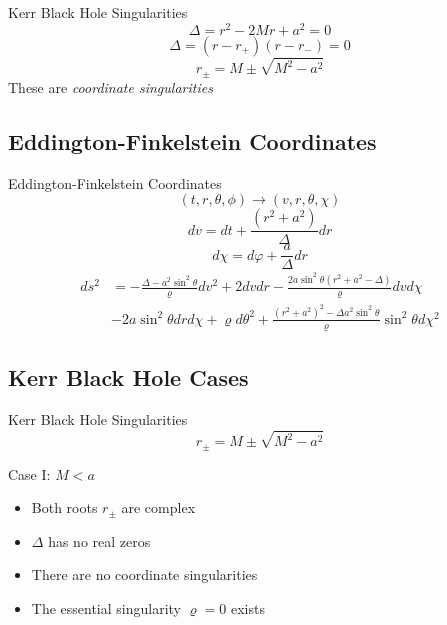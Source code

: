\documentclass{beamer}
\begin{document}
        \begin{frame}{Kerr Black Hole Singularities}
            $$\Delta =  r^{2}-2Mr+a^{2} = 0$$
            \pause
            $$\Delta = \left( r-r_{+} \right) \left( r-r_{-} \right) = 0 $$
            $$r_{\pm}=M\pm\sqrt{M^{2}-a^{2}}$$
            \pause
            These are \textit{coordinate singularities}
    	\end{frame}

	\subsection{Eddington-Finkelstein Coordinates}
        \begin{frame}{Eddington-Finkelstein Coordinates}
        	$$ (t, r, \theta, \phi) \longrightarrow (v, r, \theta, \chi) $$
            \pause
            $$ dv =  dt+\frac{\left(r^{2}+a^{2}\right)}{\Delta}dr$$
			$$ d\chi  =  d\varphi+\frac{a}{\Delta}dr$$
            \pause
        	\begin{align*}
ds^{2} & = -\frac{\Delta-a^{2}\sin^{2}\theta}{\varrho}dv^{2}+2dvdr-\frac{2a\sin^{2}\theta\left(r^{2}+a^{2}-\Delta\right)}{\varrho}dvd\chi\nonumber \\
 &  -2a\sin^{2}\theta drd\chi+\varrho d\theta^{2}+\frac{\left(r^{2}+a^{2}\right)^{2}-\Delta a^{2}\sin^{2}\theta}{\varrho}\sin^{2}\theta d\chi^{2}
\end{align*}
    	\end{frame}
        

	\subsection{Kerr Black Hole Cases}
    	\begin{frame}{Kerr Black Hole Singularities}
            $$r_{\pm}=M\pm\sqrt{M^{2}-a^{2}}$$
    	\end{frame}
       
        \begin{frame}{Case I: $M<a$}
            \begin{itemize}
            \item Both roots $r_{\pm}$ are complex
            \pause
            \item $\Delta$ has no real zeros 
            \pause
            \item There are no coordinate singularities
            \pause
            \item The essential singularity $\varrho=0$ exists
            \end{itemize}
        \end{frame}
        
\end{document}
